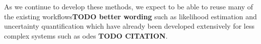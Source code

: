 \documentclass[10pt,letterpaper]{article}
\begin{document}
As we continue to develop these methods, we expect to be able to reuse many of the existing
workflows\textbf{TODO better wording} such as likelihood estimation and uncertainty quantification
which have already been developed extensively for less complex systems such as \acp{ode}
\textbf{TODO CITATION}.

%
%
%
\end{document}
